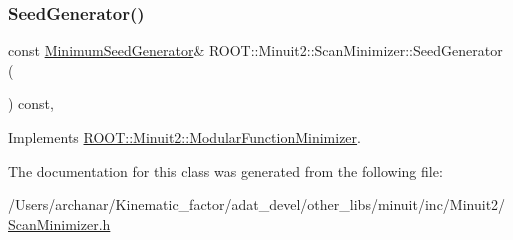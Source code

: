 \mbox{\label{classROOT_1_1Minuit2_1_1ScanMinimizer_aaad34811cf2862cd8b66b634a1c9ba07}} 
\subsubsection{\texorpdfstring{SeedGenerator()}{SeedGenerator()}\hspace{0.1cm}{\footnotesize\ttfamily [2/2]}}
{\footnotesize\ttfamily const \mbox{\hyperlink{classROOT_1_1Minuit2_1_1MinimumSeedGenerator}{Minimum\+Seed\+Generator}}\& R\+O\+O\+T\+::\+Minuit2\+::\+Scan\+Minimizer\+::\+Seed\+Generator (\begin{DoxyParamCaption}{ }\end{DoxyParamCaption}) const\hspace{0.3cm}{\ttfamily [inline]}, {\ttfamily [virtual]}}



Implements \mbox{\hyperlink{classROOT_1_1Minuit2_1_1ModularFunctionMinimizer_a742930de97b0ce9ba23773874ae0894b}{R\+O\+O\+T\+::\+Minuit2\+::\+Modular\+Function\+Minimizer}}.



The documentation for this class was generated from the following file\+:\begin{DoxyCompactItemize}
\item 
/\+Users/archanar/\+Kinematic\+\_\+factor/adat\+\_\+devel/other\+\_\+libs/minuit/inc/\+Minuit2/\mbox{\hyperlink{other__libs_2minuit_2inc_2Minuit2_2ScanMinimizer_8h}{Scan\+Minimizer.\+h}}\end{DoxyCompactItemize}

